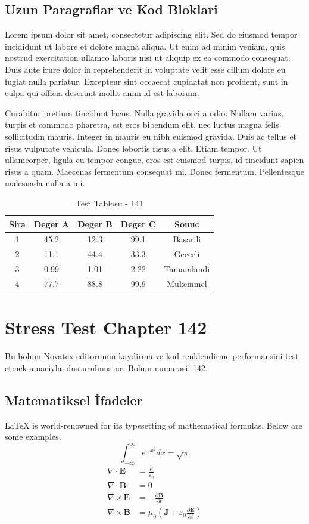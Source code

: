 \documentclass[12pt,a4paper]{article}
\begin{document}
\subsection{Uzun Paragraflar ve Kod Bloklari}
Lorem ipsum dolor sit amet, consectetur adipiscing elit. Sed do eiusmod tempor incididunt ut labore et dolore magna aliqua. Ut enim ad minim veniam, quis nostrud exercitation ullamco laboris nisi ut aliquip ex ea commodo consequat. Duis aute irure dolor in reprehenderit in voluptate velit esse cillum dolore eu fugiat nulla pariatur. Excepteur sint occaecat cupidatat non proident, sunt in culpa qui officia deserunt mollit anim id est laborum.

Curabitur pretium tincidunt lacus. Nulla gravida orci a odio. Nullam varius, turpis et commodo pharetra, est eros bibendum elit, nec luctus magna felis sollicitudin mauris. Integer in mauris eu nibh euismod gravida. Duis ac tellus et risus vulputate vehicula. Donec lobortis risus a elit. Etiam tempor. Ut ullamcorper, ligula eu tempor congue, eros est euismod turpis, id tincidunt sapien risus a quam. Maecenas fermentum consequat mi. Donec fermentum. Pellentesque malesuada nulla a mi.

\begin{table}[h!]
\centering
\begin{tabular}{|c|c|c|c|c|}
\hline
\textbf{Sira} & \textbf{Deger A} & \textbf{Deger B} & \textbf{Deger C} & \textbf{Sonuc} \\
\hline
1 & 45.2 & 12.3 & 99.1 & Basarili \\
2 & 11.1 & 44.4 & 33.3 & Gecerli \\
3 & 0.99 & 1.01 & 2.22 & Tamamlandi \\
4 & 77.7 & 88.8 & 99.9 & Mukemmel \\
\hline
\end{tabular}
\caption{Test Tablosu - 141}
\end{table}

\newpage
\section{Stress Test Chapter 142}
Bu bolum Novatex editorunun kaydirma ve kod renklendirme performansini test etmek amaciyla olusturulmustur. Bolum numarasi: 142.

\subsection{Matematiksel İfadeler}
\LaTeX{} is world-renowned for its typesetting of mathematical formulas. Below are some examples.
\begin{equation}
\int_{-\infty}^{\infty} e^{-x^2} dx = \sqrt{\pi}
\end{equation}
\begin{align}
\nabla \cdot \mathbf{E} &= \frac{\rho}{\varepsilon_0} \\
\nabla \cdot \mathbf{B} &= 0 \\
\nabla \times \mathbf{E} &= -\frac{\partial \mathbf{B}}{\partial t} \\
\nabla \times \mathbf{B} &= \mu_0\left(\mathbf{J} + \varepsilon_0 \frac{\partial \mathbf{E}}{\partial t}\right)
\end{align}
\end{document}
